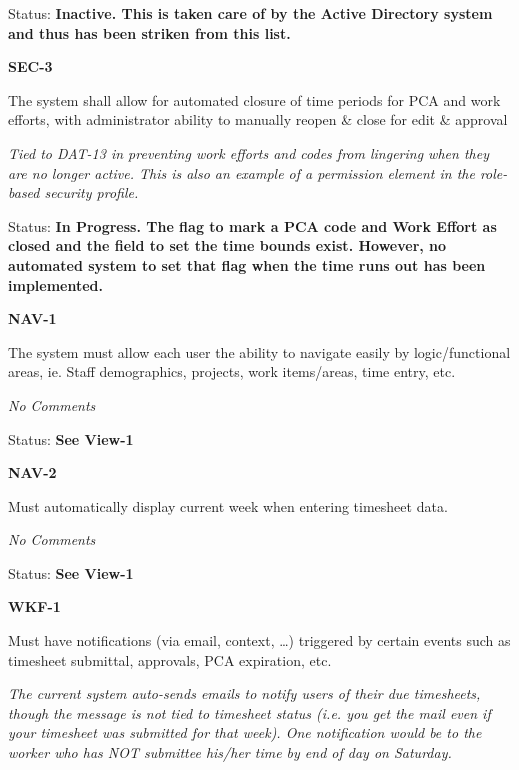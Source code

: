 \noindent Status: \textbf{Inactive.  This is taken care of by the Active Directory system and thus has been striken from this list.}\\

\noindent 

\noindent \textbf{SEC-3}

\noindent The system shall allow for automated closure of time periods for PCA and work efforts, with administrator ability to manually reopen \& close for edit \& approval

\noindent \textit{Tied to DAT-13 in preventing work efforts and codes from lingering when they are no longer active. This is also an example of a permission element in the role-based security profile.}

\noindent Status: \textbf{In Progress.  The flag to mark a PCA code and Work Effort as closed and the field to set the time bounds exist.  However, no automated system to set that flag when the time runs out has been implemented.}\\

\noindent 

\noindent \textbf{NAV-1}

\noindent The system must allow each user the ability to navigate easily by logic/functional areas, ie. Staff demographics, projects, work items/areas, time entry, etc.

 \textit{No Comments}

Status: \textbf{See View-1}\textit{}\\

\noindent 

\noindent \textbf{NAV-2}

\noindent Must automatically display current week when entering timesheet data.

 \textit{No Comments }

\textit{ }Status: \textbf{See View-1}\textit{}\\

\noindent 

\noindent \textbf{WKF-1}

\noindent Must have notifications (via email, context, \dots ) triggered by certain events such as timesheet submittal, approvals, PCA expiration, etc.

\noindent \textit{The current system auto-sends emails to notify users of their due timesheets, though the message is not tied to timesheet status (i.e. you get the mail even if your timesheet was submitted for that week). One notification would be to the worker who has NOT submittee his/her time by end of day on Saturday.}

